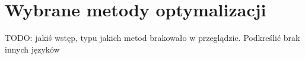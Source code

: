 \chapter{Wybrane metody optymalizacji}\label{chapter:wybrane_metody_optimalizacji}

TODO: jakiś wstęp, typu jakich metod brakowało w przeglądzie. Podkreślić brak innych języków






